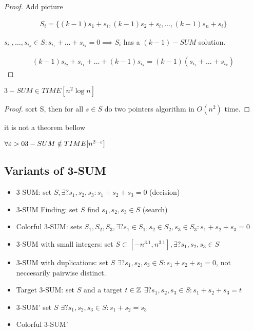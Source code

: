 \begin{proof}
	{\color{red} Add picture}

	\begin{align*}
		S_i = \{(k - 1)s_1 + s_i, (k - 1)s_2 + s_i, \ldots, (k - 1)s_n + s_i \}
	\end{align*}

	$s_{i_1}, \ldots, s_{i_k} \in S: s_{i_1} + \ldots + s_{i_k} = 0 \implies S_i $ has a $(k - 1)-SUM$ solution.

	\begin{align*}
		(k - 1)s_{i_2} + s_{i_1} + \ldots + (k - 1)s_{i_k} = (k - 1)(s_{i_1} + \ldots + s_{i_k})
	\end{align*}
\end{proof}

\begin{crly}
	$3-SUM \in TIME[n^2 \log n]$
\end{crly}

\begin{proof}
	sort S, then
	for all $s \in S$ do two pointers algorithm in $O(n^2)$ time.
\end{proof}

{\color{red} it is not a theorem bellow}
\begin{thm}
	$\forall \varepsilon > 0 3-SUM \notin TIME[n^{2 - \varepsilon}]$
\end{thm}

\subsection{Variants of 3-SUM}

\begin{itemize}
	\item 3-SUM: set $S, \exists ? s_1, s_2, s_3 : s_1 + s_2 + s_3 = 0$ (decision)
	\item 3-SUM Finding: set $S$ find $s_1, s_2, s_3 \in S$ (search)
	\item Colorful 3-SUM: sets $S_1, S_2, S_3, \exists ? s_1 \in S_1, s_2 \in S_2, s_3 \in S_3: s_1 + s_2 + s_3 = 0$
	\item 3-SUM with small integers: set $S \subset [-n^{3.1}, n^{3.1}], \exists? s_1, s_2, s_3 \in S$
	\item 3-SUM with duplications: set $S$ $\exists ? s_1, s_2, s_3 \in S: s_1 + s_2 + s_3 = 0$, not neccesarily pairwise distinct.
	\item Target 3-SUM: set $S$ and a target $t \in \mathbb{Z}$ $\exists ? s_1, s_2, s_3 \in S: s_1 + s_2 + s_3 = t$
	\item 3-SUM' set $S $ $\exists ? s_1, s_2, s_3 \in S: s_1 + s_2 = s_3$
	\item Colorful 3-SUM'

\end{itemize}

